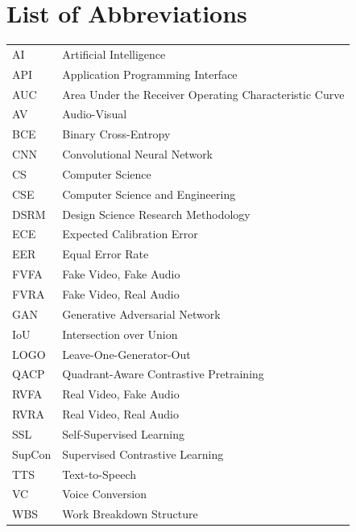 \chapter*{List of Abbreviations}

\begin{tabular}{p{2.8cm} p{11.5cm}}
AI & Artificial Intelligence \\
API & Application Programming Interface \\
AUC & Area Under the Receiver Operating Characteristic Curve \\
AV & Audio-Visual \\
BCE & Binary Cross-Entropy \\
CNN & Convolutional Neural Network \\
CS & Computer Science \\
CSE & Computer Science and Engineering \\
DSRM & Design Science Research Methodology \\
ECE & Expected Calibration Error \\
EER & Equal Error Rate \\
FVFA & Fake Video, Fake Audio \\
FVRA & Fake Video, Real Audio \\
GAN & Generative Adversarial Network \\
IoU & Intersection over Union \\
LOGO & Leave-One-Generator-Out \\
QACP & Quadrant-Aware Contrastive Pretraining \\
RVFA & Real Video, Fake Audio \\
RVRA & Real Video, Real Audio \\
SSL & Self-Supervised Learning \\
SupCon & Supervised Contrastive Learning \\
TTS & Text-to-Speech \\
VC & Voice Conversion \\
WBS & Work Breakdown Structure \\
\end{tabular}

\clearpage

